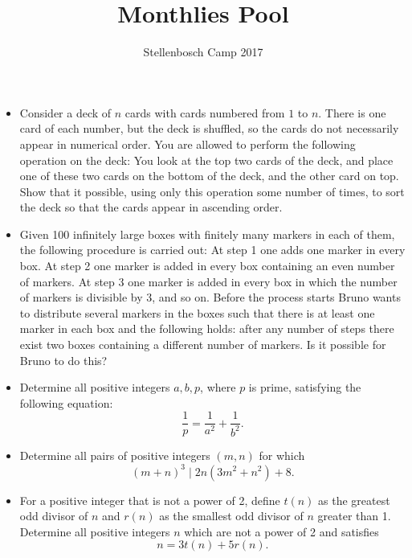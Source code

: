 \documentclass[12pt]{article}
\title{Monthlies Pool}
\author{Stellenbosch Camp 2017}
\begin{document}
 \maketitle

\begin{itemize}

\item %

Consider a deck of $n$ cards with cards numbered from $1$ to $n$. There is one card of each number, but the deck is shuffled, so the cards do not necessarily appear in numerical order. You are allowed to perform the following operation on the deck: You look at the top two cards of the deck, and place one of these two cards on the bottom of the deck, and the other card on top. Show that it possible, using only this operation some number of times, to sort the deck so that the cards appear in ascending order. 


\item %
Given 100 infinitely large boxes with finitely many markers in each of them, the following procedure is carried out: At step 1 one adds one marker in every box. At step 2 one marker is added in every box containing an even number of markers. At step 3 one marker is added in every box in which the number of markers is divisible by 3, and so on. Before the process starts Bruno wants to distribute several markers in the boxes such that there is at least one marker in each box and the following holds: after any number of steps there exist two boxes containing a different number of markers. Is it possible for Bruno to do this?


\item %
Determine all positive integers $a,b,p$, where $p$ is prime, satisfying the following equation:
  \[ \frac{1}{p} = \frac{1}{a^2} + \frac{1}{b^2}. \]


\item %
Determine all pairs of positive integers $(m,n)$ for which
	\[(m+n)^3 \mid 2n(3m^2+n^2) + 8.\]


\item %
For a positive integer that is not a power of 2, define $t(n)$ as the greatest odd divisor of $n$ and $r(n)$ as the smallest odd divisor of $n$ greater than 1. Determine all positive integers $n$ which are not a power of 2 and satisfies
	\[ n = 3t(n)+5r(n).\]



\end{itemize}
\end{document}
